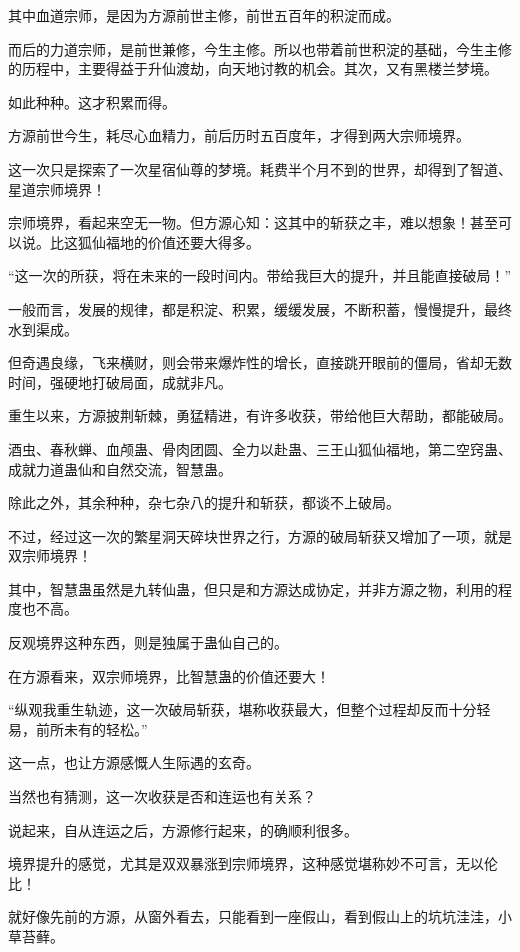 \begin{this_body}
其中血道宗师，是因为方源前世主修，前世五百年的积淀而成。

而后的力道宗师，是前世兼修，今生主修。所以也带着前世积淀的基础，今生主修的历程中，主要得益于升仙渡劫，向天地讨教的机会。其次，又有黑楼兰梦境。

如此种种。这才积累而得。

方源前世今生，耗尽心血精力，前后历时五百度年，才得到两大宗师境界。

这一次只是探索了一次星宿仙尊的梦境。耗费半个月不到的世界，却得到了智道、星道宗师境界！

宗师境界，看起来空无一物。但方源心知：这其中的斩获之丰，难以想象！甚至可以说。比这狐仙福地的价值还要大得多。

“这一次的所获，将在未来的一段时间内。带给我巨大的提升，并且能直接破局！”

一般而言，发展的规律，都是积淀、积累，缓缓发展，不断积蓄，慢慢提升，最终水到渠成。

但奇遇良缘，飞来横财，则会带来爆炸性的增长，直接跳开眼前的僵局，省却无数时间，强硬地打破局面，成就非凡。

重生以来，方源披荆斩棘，勇猛精进，有许多收获，带给他巨大帮助，都能破局。

酒虫、春秋蝉、血颅蛊、骨肉团圆、全力以赴蛊、三王山狐仙福地，第二空窍蛊、成就力道蛊仙和自然交流，智慧蛊。

除此之外，其余种种，杂七杂八的提升和斩获，都谈不上破局。

不过，经过这一次的繁星洞天碎块世界之行，方源的破局斩获又增加了一项，就是双宗师境界！

其中，智慧蛊虽然是九转仙蛊，但只是和方源达成协定，并非方源之物，利用的程度也不高。

反观境界这种东西，则是独属于蛊仙自己的。

在方源看来，双宗师境界，比智慧蛊的价值还要大！

“纵观我重生轨迹，这一次破局斩获，堪称收获最大，但整个过程却反而十分轻易，前所未有的轻松。”

这一点，也让方源感慨人生际遇的玄奇。

当然也有猜测，这一次收获是否和连运也有关系？

说起来，自从连运之后，方源修行起来，的确顺利很多。

境界提升的感觉，尤其是双双暴涨到宗师境界，这种感觉堪称妙不可言，无以伦比！

就好像先前的方源，从窗外看去，只能看到一座假山，看到假山上的坑坑洼洼，小草苔藓。


\end{this_body}
